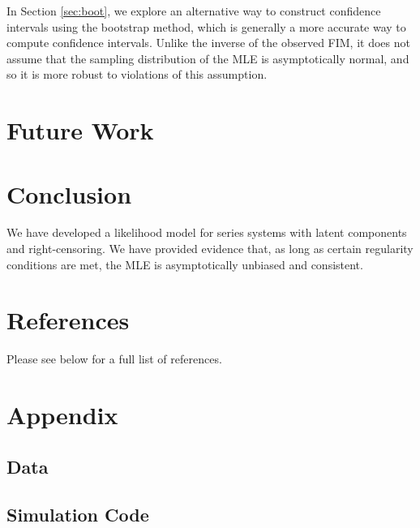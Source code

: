 \documentclass[
]{article}
\newenvironment{cslreferences}%
  {}%
  {\par}
\begin{document}
In Section \ref{sec:boot}, we explore an alternative way to construct
confidence intervals using the bootstrap method, which is generally a
more accurate way to compute confidence intervals. Unlike the inverse of
the observed FIM, it does not assume that the sampling distribution of
the MLE is asymptotically normal, and so it is more robust to violations
of this assumption.

\hypertarget{future-work}{%
\section{Future Work}\label{future-work}}

\hypertarget{conclusion}{%
\section{Conclusion}\label{conclusion}}

We have developed a likelihood model for series systems with latent
components and right-censoring. We have provided evidence that, as long
as certain regularity conditions are met, the MLE is asymptotically
unbiased and consistent.

\hypertarget{references}{%
\section*{References}\label{references}}

Please see below for a full list of references.

\hypertarget{refs}{}
\begin{cslreferences}
\end{cslreferences}

\hypertarget{app}{%
\section{Appendix}\label{app}}

\hypertarget{app:data}{%
\subsection{Data}\label{app:data}}

\hypertarget{simulation-code}{%
\subsection*{Simulation Code}\label{simulation-code}}
\end{document}
